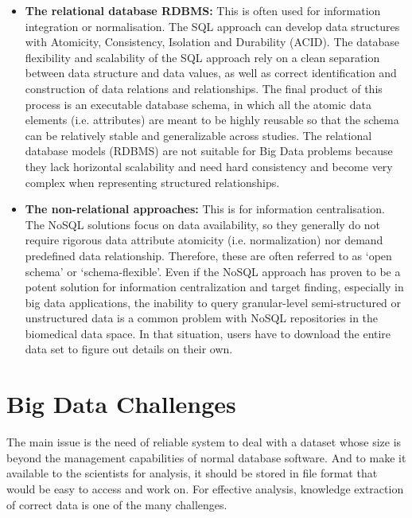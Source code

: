 \documentclass[10pt,a4paper,twoside]{article}
\begin{document}
\begin{itemize}
 \item \textbf{The relational database RDBMS:} This is often used for information integration or normalisation. The SQL approach can develop data structures with Atomicity, Consistency, Isolation and Durability (ACID). The database flexibility and scalability of the SQL approach rely on a clean separation between data structure and data values, as well as correct identification and construction of data relations and relationships. The final product of this process is an executable database schema, in which all the atomic data elements (i.e. attributes) are meant to be highly reusable so that the schema can be relatively stable and generalizable across studies. The relational database models (RDBMS) are not suitable for Big Data problems because they lack horizontal scalability and need hard consistency and become very complex when representing structured relationships.

 \item \textbf{The non-relational approaches: }This is for information centralisation. The NoSQL solutions focus on data availability, so they generally do not require rigorous data attribute atomicity (i.e. normalization) nor demand predefined data relationship. Therefore, these are often referred to as ‘open schema’ or ‘schema-flexible’. Even if the NoSQL approach has proven to be a potent solution for information centralization and target finding, especially in big data applications, the inability to query granular-level semi-structured or unstructured data is a common problem with NoSQL repositories in the biomedical data space. In that situation, users have to download the entire data set to figure out details on their own.
\end{itemize}

\section*{Big Data Challenges }
The main issue is the need of reliable system to deal with a dataset whose size is beyond the management capabilities of normal database software. And to make it available to the scientists for analysis, it should be stored in file format that would be easy to access and work on. For effective analysis, knowledge extraction of correct data is one of the many challenges. 
\end{document}

